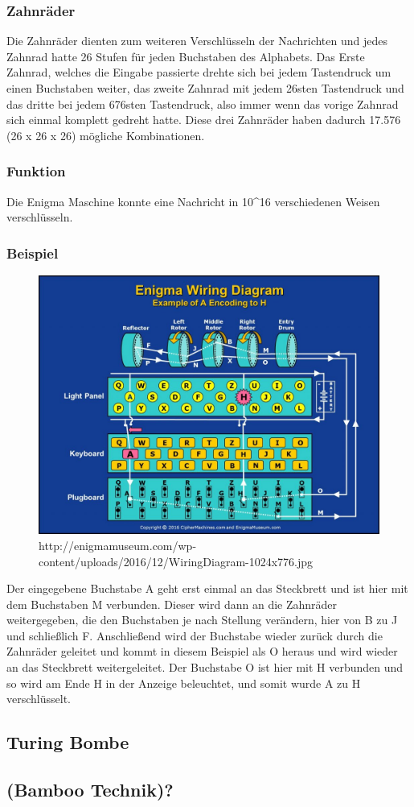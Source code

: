 \subsubsection{Zahnräder}
Die Zahnräder dienten zum weiteren Verschlüsseln der Nachrichten und jedes Zahnrad hatte 26 Stufen für jeden Buchstaben des Alphabets. Das Erste Zahnrad, welches die Eingabe passierte drehte sich bei jedem Tastendruck um einen Buchstaben weiter, das zweite Zahnrad mit jedem 26sten Tastendruck und das dritte bei jedem 676sten Tastendruck, also immer wenn das vorige Zahnrad sich einmal komplett gedreht hatte. Diese drei Zahnräder haben dadurch 17.576 (26 x 26 x 26) mögliche Kombinationen.

\subsubsection{Funktion}
Die Enigma Maschine konnte eine Nachricht in 10^16 verschiedenen Weisen verschlüsseln.

\subsubsection{Beispiel}

\begin{figure}[hbtp]
\centering
\includegraphics[scale=0.2]{Enigma_Maschine_Beispiel.jpg}
\caption{http://enigmamuseum.com/wp-content/uploads/2016/12/WiringDiagram-1024x776.jpg}
\end{figure}

Der eingegebene Buchstabe A geht erst einmal an das Steckbrett und ist hier mit dem Buchstaben M verbunden. Dieser wird dann an die Zahnräder weitergegeben, die den Buchstaben je nach Stellung verändern, hier von B zu J und schließlich F. Anschließend wird der Buchstabe wieder zurück durch die Zahnräder geleitet und kommt in diesem Beispiel als O heraus und wird wieder an das Steckbrett weitergeleitet. Der Buchstabe O ist hier mit H verbunden und so wird am Ende H in der Anzeige beleuchtet, und somit wurde A zu H verschlüsselt.

\subsection{Turing Bombe}


\subsection{(Bamboo Technik)?}